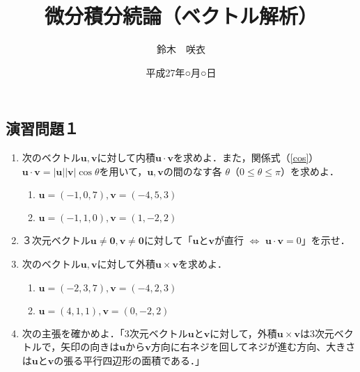 \documentclass{jarticle}
\begin{document}
\title{微分積分続論（ベクトル解析）} 
\author{鈴木　咲衣}
\date{平成27年○月○日}
\maketitle

\subsection{演習問題１}

\begin{enumerate}
\item 次のベクトル$\bm u, \bm v$に対して内積$\bm u \cdot \bm v$を求めよ．また，関係式（\ref{cos}）$\bm u \cdot \bm v=|\bm u| |\bm v|\cos \theta $を用いて，$\bm u, \bm v$の間のなす各 $\theta$（$0\leq \theta \leq \pi$）を求めよ．
\begin{enumerate}
\item $\bm u= (-1, 0, 7), \bm v= (-4, 5,3)$ \label{a}
\item $\bm u= (-1, 1, 0), \bm v= (1, -2, 2)$ \label{b}
\end{enumerate}

\item ３次元ベクトル$\bm u\not =\bm 0, \bm v\not= \bm 0$に対して「$\bm u$と$\bm v$が直行 $\iff$ $\bm u \cdot \bm v=0$」を示せ．
\item 次のベクトル$\bm u, \bm v$に対して外積$\bm u \times \bm v$を求めよ．
\begin{enumerate}
\item $\bm u= (-2, 3, 7), \bm v= (-4, 2,3)$
\item $\bm u= (4, 1, 1), \bm v= (0, -2, 2)$
\end{enumerate}

\item 次の主張を確かめよ．「$3$次元ベクトル$\bm u$と$\bm v$に対して，外積$\bm u \times \bm v$は$3$次元ベクトルで，矢印の向きは$\bm u$から$\bm v$方向に右ネジを回してネジが進む方向、大きさは$\bm u$と$\bm v$の張る平行四辺形の面積である．」
\end{enumerate}

\newpage
\end{document}
